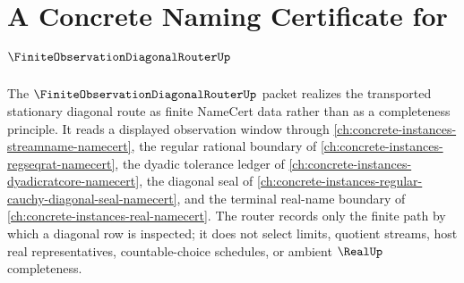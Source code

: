 \chapter{A Concrete Naming Certificate for $\FiniteObservationDiagonalRouterUp$}
\label{ch:concrete-instances-finite-observation-diagonal-router-namecert}

The $\FiniteObservationDiagonalRouterUp$ packet realizes the transported stationary diagonal route as finite NameCert data rather than as a completeness principle. It reads a displayed observation window through \autoref{ch:concrete-instances-streamname-namecert}, the regular rational boundary of \autoref{ch:concrete-instances-regseqrat-namecert}, the dyadic tolerance ledger of \autoref{ch:concrete-instances-dyadicratcore-namecert}, the diagonal seal of \autoref{ch:concrete-instances-regular-cauchy-diagonal-seal-namecert}, and the terminal real-name boundary of \autoref{ch:concrete-instances-real-namecert}. The router records only the finite path by which a diagonal row is inspected; it does not select limits, quotient streams, host real representatives, countable-choice schedules, or ambient $\RealUp$ completeness.

